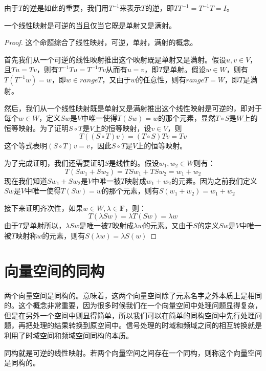 \documentclass[10pt,a4paper,UTF8]{article}
\begin{document}
由于\(T\)的逆是如此的重要，我们用\(T^{-1}\)来表示\(T\)的逆，即\(TT^{-1} = T^{-1}T = I\)。
\begin{theorem}
一个线性映射是可逆的当且仅当它既是单射又是满射。
\end{theorem}
\begin{proof}
这个命题综合了线性映射，可逆，单射，满射的概念。

首先我们从一个可逆的线性映射推出这个映射既是单射又是满射。假设\(u,v\in V\)，且\(Tu=Tv\)，则有\(T^{-1}Tu = T^{-1}Tv\)从而有\(u=v\)，即\(T\)是单射。假设\(w\in W\)，则有\(T(T^{-1}w) = w\)，即\(w\in rangeT\)，又由于\(w\)的任意性，则有\(rangeT = W\)，即\(T\)是满射。

然后，我们从一个线性映射既是单射又是满射推出这个线性映射是可逆的，即对于每个\(w\in W\)，定义\(Sw\)是\(V\)中唯一使得\(T(Sw) = w\)的那个元素，显然\(T\circ S\)是\(W\)上的恒等映射。为了证明\(S\circ T\)是\(V\)上的恒等映射，设\(v\in V\)，则\[T((S\circ T)v) = (T\circ S)Tv = Tv\]这个等式表明\((S\circ T)v = v\)，因此\(S\circ T\)是\(V\)上的恒等映射。

为了完成证明，我们还需要证明\(S\)是线性的。假设\(w_{1},w_{2}\in W\)则有：\[T(Sw_{1} + Sw_{2}) = TSw_{1} + TSw_{2} = w_{1} + w_{2}\]
现在我们知道\(Sw_{1} + Sw_{2}\)是\(V\)中唯一被\(T\)映射成\(w_{1} + w_{2}\)的元素。因为之前我们定义\(Sw\)是\(V\)中唯一使得\(T(Sw) = w\)的那个元素，则有\(S(w_{1} + w_{2}) = w_{1} + w_{2}\)

接下来证明齐次性，如果\(w\in W, \lambda \in \mathbf{F}\)，则：\[T(\lambda Sw) = \lambda T(Sw) = \lambda w\]
由于\(T\)是单射所以，\(\lambda Sw\)是唯一被\(T\)映射成\(\lambda w\)的元素。又由于\(S\)的定义\(Sw\)是\(V\)中唯一被\(T\)映射称\(w\)的元素，则有\(S(\lambda w) = \lambda S(w)\)
\end{proof}

\section{向量空间的同构}
\label{sec:org56086f5}


两个向量空间是同构的。意味着，这两个向量空间除了元素名字之外本质上是相同的。这个概念非常重要，因为很多时候我们在一个向量空间中处理问题显得复杂，但是在另外一个空间中则显得简单，所以我们可以在简单的同构空间中先行处理问题，再把处理的结果转换到原空间中。信号处理的时域和频域之间的相互转换就是利用了时域空间和频域空间同构的本质。

\begin{definition}
同构就是可逆的线性映射。若两个向量空间之间存在一个同构，则称这个向量空间是同构的。
\end{definition}
\end{document}
